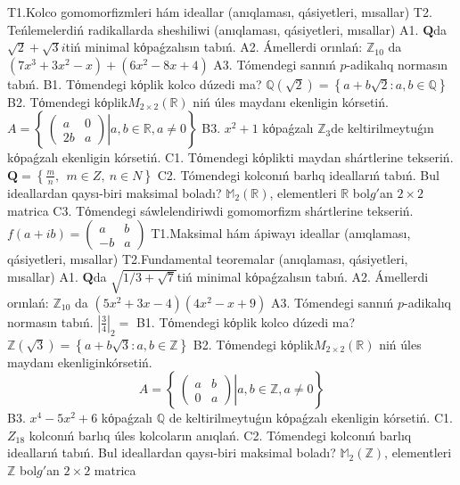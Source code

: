 T1.Kolco gomomorfizmleri hám ideallar (anıqlaması, qásiyetleri, mısallar)
T2. Teńlemelerdiń radikallarda sheshiliwi (anıqlaması, qásiyetleri, mısallar)
A1. \(\mathbf{Q}\)da \(\sqrt{2} + \sqrt{3}i\)tiń minimal kόpaǵzalısın tabıń.
A2. Ámellerdi orınlań: \(\mathbb{Z}_{10}\) da \(\left( 7x^{3} + 3x^{2} - x \right) + \left( 6x^{2} - 8x + 4 \right)\)
A3. Tómendegi sannıń \(p\)-adikalıq normasın tabıń.
B1. Tόmendegi kόplik kolco dúzedi ma? \(\mathbb{Q}\left( \sqrt{2} \right) = \left\{ a + b\sqrt{2}:a,b \in \mathbb{Q} \right\}\)
B2. Tόmendegi kόplik\(M_{2 \times 2}\left( \mathbb{R} \right)\) niń úles maydanı ekenligin kórsetiń. \(A = \left\{ \left. \ \begin{pmatrix}
a & 0 \\
2b & a
\end{pmatrix} \right|a,b\mathbb{\in R},a \neq 0 \right\}\)
B3. \(x^{2} + 1\) kόpaǵzalı \(\mathbb{Z}_{3}\)de keltirilmeytuǵın kόpaǵzalı ekenligin kórsetiń.
C1. Tόmendegi kόplikti maydan shártlerine tekseriń. \(\mathbf{Q} = \left\{ \frac{m}{n},\ \ m \in Z,\ n \in N \right\}\)
C2. Tómendegi kolconıń barlıq ideallarıń tabıń. Bul ideallardan qaysı-biri maksimal boladı? \(\mathbb{M}_{2}\left( \mathbb{R} \right)\), elementleri \(\mathbb{R}\) bol\(g'\)an \(2 \times 2\) matrica
C3. Tόmendegi sáwlelendiriwdi gomomorfizm shártlerine tekseriń. \(f(a + ib) = \begin{pmatrix}
a & b \\
 - b & a
\end{pmatrix}\)
T1.Maksimal hám ápiwayı ideallar (anıqlaması, qásiyetleri, mısallar)
T2.Fundamental teoremalar (anıqlaması, qásiyetleri, mısallar)
A1. \(\mathbf{Q}\)da \(\sqrt{1/3 + \sqrt{7}}\)tiń minimal kόpaǵzalısın tabıń.
A2. Ámellerdi orınlań: \(\mathbb{Z}_{10}\) da \(\left( 5x^{2} + 3x - 4 \right)\left( 4x^{2} - x + 9 \right)\)
A3. Tómendegi sannıń \(p\)-adikalıq normasın tabıń. \(|\frac{3}{4}|_{2} =\)
B1. Tόmendegi kόplik kolco dúzedi ma? \(\mathbb{Z}\left( \sqrt{3} \right) = \left\{ a + b\sqrt{3}:a,b \in \mathbb{Z} \right\}\)
B2. Tόmendegi kόplik\(M_{2 \times 2}\left( \mathbb{R} \right)\) niń úles maydanı ekenliginkórsetiń.
\[A = \left\{ \left. \ \begin{pmatrix}
a & b \\
0 & a
\end{pmatrix} \right|a,b\mathbb{\in Z},a \neq 0 \right\}\]
B3. \(x^{4} - 5x^{2} + 6\) kόpaǵzalı \(\mathbb{Q}\) de keltirilmeytuǵın kόpaǵzalı ekenligin kórsetiń.
C1. \(Z_{18}\) kolconıń barlıq úles kolcoların anıqlań.
C2. Tómendegi kolconıń barlıq ideallarıń tabıń. Bul ideallardan qaysı-biri maksimal boladı? \(\mathbb{M}_{2}\left( \mathbb{Z} \right)\), elementleri \(\mathbb{Z}\) bol\(g'\)an \(2 \times 2\) matrica
